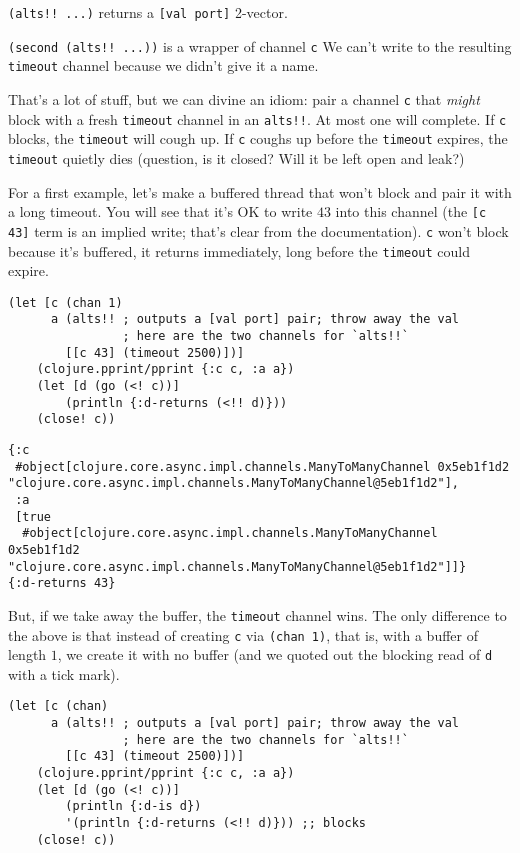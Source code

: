 \documentclass[10pt,oneside,x11names]{article}
\begin{document}
\texttt{(alts!! ...)} returns a \texttt{[val port]} 2-vector.

\texttt{(second (alts!! ...))} is a wrapper of channel \texttt{c} We can't write to
the resulting \texttt{timeout} channel because we didn't give it a name.

That's a lot of stuff, but we can divine an idiom: pair a channel \texttt{c}
that \emph{might} block with a fresh \texttt{timeout} channel in an \texttt{alts!!}. At
most one will complete. If \texttt{c} blocks, the \texttt{timeout} will cough up. If
\texttt{c} coughs up before the \texttt{timeout} expires, the \texttt{timeout} quietly dies
(question, is it closed? Will it be left open and leak?)

For a first example, let's make a buffered thread that won't block and
pair it with a long timeout. You will see that it's OK to write \(43\)
into this channel (the \texttt{[c 43]} term is an implied write; that's clear
from the documentation). \texttt{c} won't block because it's buffered, it
returns immediately, long before the \texttt{timeout} could expire.

\begin{verbatim}
(let [c (chan 1)
      a (alts!! ; outputs a [val port] pair; throw away the val
                ; here are the two channels for `alts!!`
        [[c 43] (timeout 2500)])]
    (clojure.pprint/pprint {:c c, :a a})
    (let [d (go (<! c))]
        (println {:d-returns (<!! d)}))
    (close! c))
\end{verbatim}

\begin{verbatim}
{:c
 #object[clojure.core.async.impl.channels.ManyToManyChannel 0x5eb1f1d2 "clojure.core.async.impl.channels.ManyToManyChannel@5eb1f1d2"],
 :a
 [true
  #object[clojure.core.async.impl.channels.ManyToManyChannel 0x5eb1f1d2 "clojure.core.async.impl.channels.ManyToManyChannel@5eb1f1d2"]]}
{:d-returns 43}
\end{verbatim}


But, if we take away the buffer, the \texttt{timeout} channel wins. The only
difference to the above is that instead of creating \texttt{c} via \texttt{(chan 1)},
that is, with a buffer of length \(1\), we create it with no buffer (and
we quoted out the blocking read of \texttt{d} with a tick mark).

\begin{verbatim}
(let [c (chan)
      a (alts!! ; outputs a [val port] pair; throw away the val
                ; here are the two channels for `alts!!`
        [[c 43] (timeout 2500)])]
    (clojure.pprint/pprint {:c c, :a a})
    (let [d (go (<! c))]
        (println {:d-is d})
        '(println {:d-returns (<!! d)})) ;; blocks
    (close! c))
\end{verbatim}
\end{document}
